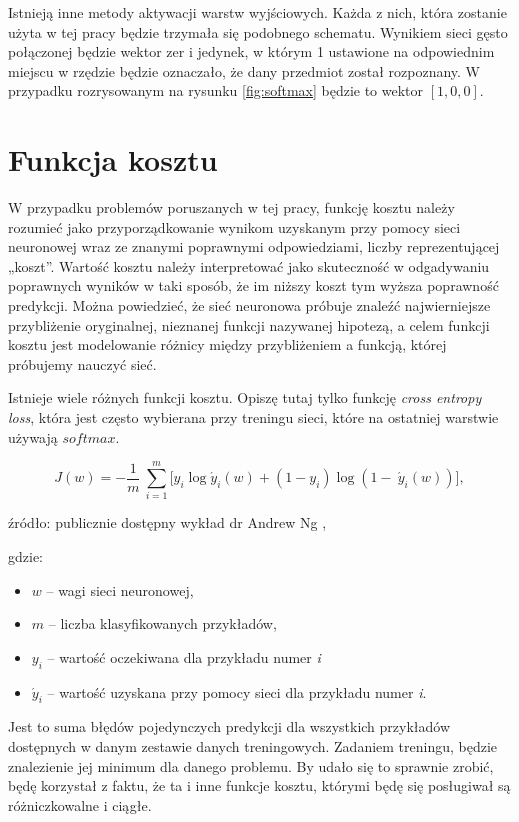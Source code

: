 Istnieją inne metody aktywacji warstw wyjściowych. Każda z nich, która zostanie użyta w tej pracy będzie trzymała się podobnego schematu. Wynikiem sieci gęsto połączonej będzie wektor zer i jedynek, w którym 1 ustawione na odpowiednim miejscu w rzędzie będzie oznaczało, że dany przedmiot został rozpoznany. W przypadku rozrysowanym na rysunku \ref{fig:softmax} będzie to wektor \([1, 0, 0]\).

\section{Funkcja kosztu}
\label{sec:costfunction}

W przypadku problemów poruszanych w tej pracy, funkcję kosztu należy rozumieć jako przyporządkowanie wynikom uzyskanym przy pomocy sieci neuronowej wraz ze znanymi poprawnymi odpowiedziami, liczby reprezentującej „koszt”. Wartość kosztu należy interpretować jako skuteczność w odgadywaniu poprawnych wyników w taki sposób, że im niższy koszt tym wyższa poprawność predykcji. Można powiedzieć, że sieć neuronowa próbuje znaleźć najwierniejsze przybliżenie oryginalnej, nieznanej funkcji nazywanej hipotezą, a celem funkcji kosztu jest modelowanie różnicy między przybliżeniem a funkcją, której próbujemy nauczyć sieć.

Istnieje wiele różnych funkcji kosztu. Opiszę tutaj tylko funkcję \textit{cross entropy loss}, która jest często wybierana przy treningu sieci, które na ostatniej warstwie używają \(softmax\).

\[J(w) = - \frac{1}{m}\ \sum_{i = 1}^{m}{\lbrack y_{i}\log{\acute{y}_{i}(w) + \left( 1 - y_{i} \right)\log{(1 - \ \acute{y}_{i}(w))}}\rbrack}, \tag{4}\]

źródło: publicznie dostępny wykład dr Andrew Ng \cite{andrewyt},

gdzie:

\begin{itemize}
\item
  \(w\) -- wagi sieci neuronowej,
\item
  \(m\) -- liczba klasyfikowanych przykładów,
\item
    \(y_{i}\) -- wartość oczekiwana dla przykładu numer \textit{i}
\item
    \(\acute{y}_{i}\) -- wartość uzyskana przy pomocy sieci dla przykładu numer \textit{i}.
\end{itemize}

Jest to suma błędów pojedynczych predykcji dla wszystkich przykładów dostępnych w danym zestawie danych treningowych. Zadaniem treningu, będzie znalezienie jej minimum dla danego problemu.
By udało się to sprawnie zrobić, będę korzystał z faktu, że ta i inne funkcje kosztu, którymi będę się posługiwał są różniczkowalne i ciągłe.

